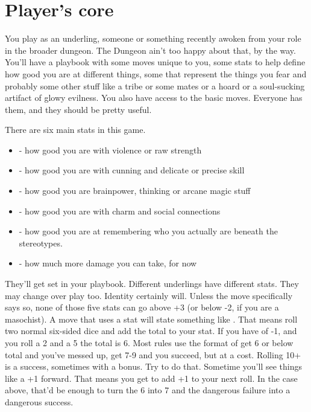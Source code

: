 \documentclass{tufte-book}
\begin{document}
\chapter{Player's core}

You play as an underling, someone or something recently awoken from your role in the broader dungeon. The Dungeon ain't too happy about that, by the way. You'll have a playbook with some moves unique to you, some stats to help define how good you are at different things, some  that represent the things you fear and probably some other stuff like a tribe or some mates or a hoard or a soul-sucking artifact of glowy evilness. You also have access to the basic moves. Everyone has them, and they should be pretty useful.


There are six main stats in this game.
\begin{itemize}
\item {} - how good you are with violence or raw strength
\item {} - how good you are with cunning and delicate or precise skill
\item {} - how good you are brainpower, thinking or arcane magic stuff
\item {} - how good you are with charm and social connections
\item {} - how good you are at remembering who you actually are beneath the stereotypes.
\item {} - how much more damage you can take, for now
\end{itemize}

They'll get set in your playbook. Different underlings have different stats. They may change over play too. Identity certainly will. Unless the move specifically says so, none of those five stats can go above +3 (or below -2, if you are a masochist). A move that uses a stat will state something like . That means roll two  normal six-sided dice and add the total to your stat. If you have  of -1, and you roll a 2 and a 5 the total is 6. Most rules use the format of get 6 or below total and you've messed up, get 7-9 and you succeed, but at a cost. Rolling 10+ is a success, sometimes with a bonus. Try to do that.
Sometime you'll see things like a +1 forward. That means you get to add +1 to your next roll. In the case above, that'd be enough to turn the 6 into 7 and the dangerous failure into a dangerous success.
\end{document}
